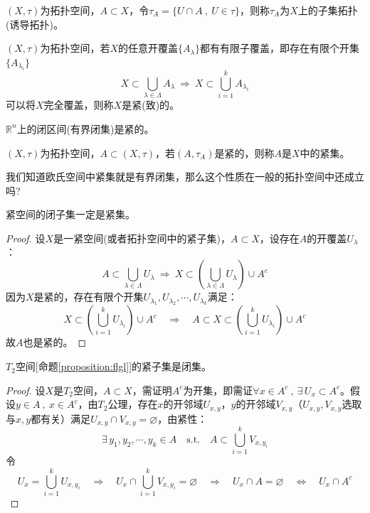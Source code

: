 \begin{definition}[子集拓扑]
    $(X,\tau)$为拓扑空间，$A \subset X$，令$\tau_A=\{U \cap A \ , \ U \in \tau\}$，则称$\tau_A$为$X$上的子集拓扑(诱导拓扑)。
\end{definition}
\begin{definition}[紧(致)性]
    $(X,\tau)$为拓扑空间，若$X$的任意开覆盖$\{A_{\lambda}\}$都有有限子覆盖，即存在有限个开集$\{A_{\lambda_i}\}$
    \[X \subset \bigcup_{\lambda \in \Lambda}A_{\lambda} \ \Rightarrow \ X \subset \bigcup_{i=1}^kA_{\lambda_i}\]
    可以将$X$完全覆盖，则称$X$是紧(致)的。
\end{definition}
\begin{example}
\quad $\mathbb{R}^n$上的闭区间(有界闭集)是紧的。
\end{example}
\begin{definition}[紧集]
    $(X,\tau)$为拓扑空间，$A \subset (X,\tau)$，若$(A,\tau_A)$是紧的，则称$A$是$X$中的紧集。
\end{definition}
我们知道欧氏空间中紧集就是有界闭集，那么这个性质在一般的拓扑空间中还成立吗?
\begin{theorem}
    紧空间的闭子集一定是紧集。
\end{theorem}
\begin{proof}
设$X$是一紧空间(或者拓扑空间中的紧子集)，$A \subset X$，设存在$A$的开覆盖$U_{\lambda}$：
\[A \subset \bigcup_{\lambda \in \Lambda}U_{\lambda} \ \Rightarrow \ X \subset \left(\bigcup_{\lambda \in \Lambda}U_{\lambda}\right) \cup A^c\]
因为$X$是紧的，存在有限个开集$U_{\lambda_1},U_{\lambda_2},\cdots,U_{\lambda_k}$满足：
\[X \subset \left(\bigcup_{i=1}^kU_{\lambda_i}\right) \cup A^c \quad \Rightarrow \quad A \subset X \subset \left(\bigcup_{i=1}^kU_{\lambda_i}\right) \cup A^c\]
故$A$也是紧的。
\end{proof}
\begin{theorem}
    $T_2$空间[命题\ref{proposition:flgl}]的紧子集是闭集。
\end{theorem}
\begin{proof}
设$X$是$T_2$空间，$A \subset X$，需证明$A^c$为开集，即需证$\forall x \in A^c \ , \ \exists \, U_x \subset A^c$。假设$y \in A \ , \ x \in A^c$，由$T_2$公理，存在$x$的开邻域$U_{x,y}$，$y$的开邻域$V_{x,y}$（$U_{x,y},V_{x,y}$选取与$x,y$都有关）满足$U_{x,y} \cap V_{x,y}=\varnothing$，由紧性：
\[\exists \, y_1,y_2,\cdots,y_k \in A \quad \text{s.t.} \quad A \subset \bigcup_{i=1}^kV_{x,y_i}\]
令
\[U_x=\bigcup_{i=1}^kU_{x,y_i} \quad \Rightarrow \quad U_x \cap \bigcup_{i=1}^kV_{x,y_i}=\varnothing \quad \Rightarrow \quad U_x \cap A=\varnothing \quad \Leftrightarrow \quad U_x \cap A^c\]
\end{proof}

